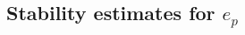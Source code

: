 \documentclass[11pt,reqno]{amsart}
\theoremstyle{definition}
\theoremstyle{plain}
\numberwithin{theorem}{section}
\numberwithin{proposition}{section}
\numberwithin{lemma}{section}
\numberwithin{equation}{section}
\newcommand{\bs}[1]{\boldsymbol{#1}}
\newcommand{\uu}[1]  {{\bs{#1}} }
\newcommand{\dep}{{{\bs{d}}}}
\newcommand{\grad}   { \uu{\nabla}    }
\renewcommand{\(}{\bigl(}
\renewcommand{\)}{\bigr)}
\def\eqd{\stackrel{\mathrm{def}}{=}}
\begin{document}
%


\subsection{Stability estimates for \texorpdfstring{$e_{p}$}{x}} \label{section:ep}
\end{document}
